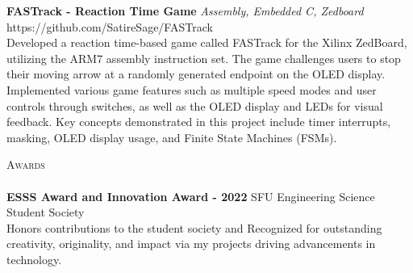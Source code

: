 \documentclass[a4paper]{article}
\newcommand{\lineunder} {
    \vspace*{-8pt} \\
    \hspace*{-18pt} \hrulefill \\
}
\newcommand{\header} [1] {
    {\hspace*{-18pt}\vspace*{6pt} \textsc{#1}}
    \vspace*{-6pt} \lineunder
}
\begin{document}
\vspace*{2mm}
{\textbf{FASTrack - Reaction Time Game}} {\sl Assembly, Embedded C, Zedboard} \hfill https://github.com/SatireSage/FASTrack\\
Developed a reaction time-based game called FASTrack for the Xilinx ZedBoard, utilizing the ARM7 assembly instruction set. The game challenges users to stop their moving arrow at a randomly generated endpoint on the OLED display. Implemented various game features such as multiple speed modes and user controls through switches, as well as the OLED display and LEDs for visual feedback. Key concepts demonstrated in this project include timer interrupts, masking, OLED display usage, and Finite State Machines (FSMs).\\
\vspace*{2mm}

\header{Awards}
\textbf{ESSS Award and Innovation Award - 2022} \hfill SFU Engineering Science Student Society\\
Honors contributions to the student society and Recognized for outstanding creativity, originality, and impact via my projects driving advancements in technology.\\
\vspace*{2mm}

\ 
\end{document}
